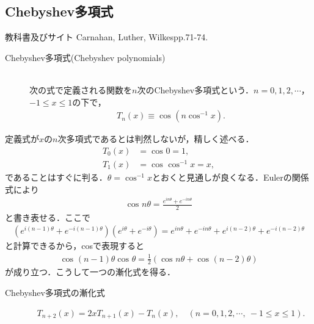 \documentclass[a4j,papersize,disablejfam,slide,14pt]{jsarticle}
\def\cos#1#2{\operatorname{cos}^{#2} #1} %
\def\exp#1{e^{#1}} %
\begin{document}
\subsection{{\rm Chebyshev}多項式}
	\begin{itembox}[l]{教科書及びサイト}
    	{\rm Carnahan, Luther, Wilkes\cite{numerical_calculation}pp.71-74.}
    \end{itembox}
    \begin{screen}
    	\begin{description}
        	\item[{\rm Chebyshev}多項式({\rm Chebyshev polynomials})]\mbox{}\\
            次の式で定義される関数を$n$次の{\rm Chebyshev}多項式という．$n = 0,1,2,\cdots$，$-1 \leq x \leq 1$の下で，
            \begin{align}
            	T_n(x) \equiv \cos{(n\cos{x}{-1})}{}.
            \end{align}
        \end{description}
    \end{screen}
    定義式が$x$の$n$次多項式であるとは判然しないが，精しく述べる．
    \begin{align}
    	T_0(x) &= \cos{0}{} = 1, \\
        T_1(x) &= \cos{\cos{x}{-1}}{} = x,
    \end{align}
    であることはすぐに判る．$\theta = \cos{x}{-1}$とおくと見通しが良くなる．{\rm Euler}の関係式により
    \begin{align}
    	\cos{n\theta}{} = \frac{\exp{in\theta} + \exp{-in\theta}}{2}
    \end{align}
    と書き表せる．ここで
    \begin{align}
    	(\exp{i(n-1)\theta} + \exp{-i(n-1)\theta})(\exp{i\theta} + \exp{-i\theta}) = \exp{in\theta} + \exp{-in\theta} + \exp{i(n-2)\theta} + \exp{-i(n-2)\theta}
    \end{align}
    と計算できるから，{\rm cos}で表現すると
    \begin{align}
    	\cos{(n-1)\theta}{}\cos{\theta}{} = \frac{1}{2}(\cos{n\theta}{} + \cos{(n-2)\theta}{})
    \end{align}
    が成り立つ．こうして一つの漸化式を得る．
    \begin{screen}
    	\begin{description}
        	\item[{\rm Chebyshev}多項式の漸化式]
            \begin{align}
            	T_{n+2}(x) = 2xT_{n+1}(x) - T_{n}(x), \quad (n=0,1,2,\cdots,\ -1 \leq x \leq 1). \label{eq:chebyshev_recurrence}
            \end{align}
        \end{description}
    \end{screen}
\end{document}
